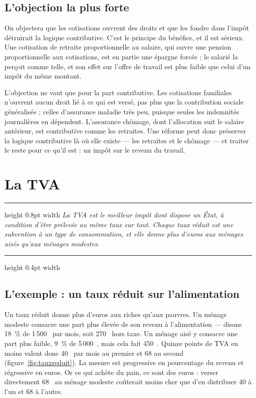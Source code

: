 \documentclass[11pt,a4paper]{article}
\providecommand{\euro}{\texteuro}
\newenvironment{argument}
  {\par\smallskip\noindent\begin{minipage}{\linewidth}%
   \color{encre}\hrule height 0.8pt width \linewidth \vspace{7pt}%
   \large\itshape}
  {\par\vspace{7pt}\hrule height 0.4pt width \linewidth\end{minipage}\par\medskip}
\begin{document}
\subsection{L'objection la plus forte}

On objectera que les cotisations ouvrent des droits et que les fondre dans l'impôt détruirait la
logique contributive. C'est le principe du bénéfice, et il est sérieux. Une cotisation de retraite
proportionnelle au salaire, qui ouvre une pension proportionnelle aux cotisations, est en partie
une épargne forcée ; le salarié la perçoit comme telle, et son effet sur l'offre de travail est
plus faible que celui d'un impôt du même montant.

L'objection ne vaut que pour la part contributive. Les cotisations familiales n'ouvrent aucun droit
lié à ce qui est versé, pas plus que la contribution sociale généralisée ; celles d'assurance
maladie très peu, puisque seules les indemnités journalières en dépendent. L'assurance chômage,
dont l'allocation suit le salaire antérieur, est contributive comme les retraites. Une réforme peut
donc préserver la logique contributive là où elle existe --- les retraites et le chômage --- et
traiter le reste pour ce qu'il est : un impôt sur le revenu du travail.

\section{La TVA}

\begin{argument}
La TVA est le meilleur impôt dont dispose un État, à condition d'être prélevée au même taux sur
tout. Chaque taux réduit est une subvention à un type de consommation, et elle donne plus d'euros
aux ménages aisés qu'aux ménages modestes.
\end{argument}

\subsection{L'exemple : un taux réduit sur l'alimentation}

Un taux réduit donne plus d'euros aux riches qu'aux pauvres. Un ménage modeste consacre une part
plus élevée de son revenu à l'alimentation --- disons 18~\% de 1\,500~\euro{} par mois, soit
270~\euro{} hors taxe. Un ménage aisé y consacre une part plus faible, 9~\% de 5\,000~\euro{}, mais
cela fait 450~\euro{}. Quinze points de TVA en moins valent donc 40~\euro{} par mois au premier et
68 au second (figure~\ref{fig:tauxreduit}). La mesure est progressive en pourcentage du revenu et
régressive en euros. Or ce qui achète du pain, ce sont des euros : verser directement 68~\euro{} au
ménage modeste coûterait moins cher que d'en distribuer 40 à l'un et 68 à l'autre.
\end{document}
